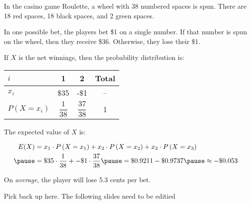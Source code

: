 \documentclass{beamer}
\newcommand{\prob}[1]{P\left({#1}\right)}
\begin{document}
\begin{frame}
\begin{example}
In the casino game Roulette, a wheel with 38 numbered spaces is spun. There are 18 red spaces, 18 black spaces, and 2 green spaces. \pause

\vspace{1mm}
In one possible bet, the players bet \$1 on a single number. If that number is spun on the wheel, then they receive \$36. Otherwise, they lose their \$1.\pause

\vspace{1mm}
If $X$ is the net winnings, then the probability distribution is:
\begin{center}
\begin{tabular}{lccc} \hline
$i$ & 1 & 2 & Total \\\hline
$x_i$ & \$35 & -\$1 & -- \\
$\prob{X=x_i}$ & $\dfrac{1}{38}$ & $\dfrac{37}{38}$ & 1\\[2mm]\hline
\end{tabular}
\end{center}\pause

The expected value of $X$ is:

\vspace{-2mm}
\begin{equation*}
\begin{aligned}
E(X) &= x_1\cdot\prob{X=x_1} + x_2\cdot\prob{X=x_2} + x_3\cdot\prob{X=x_3} \\\pause
&= \$35\cdot\dfrac{1}{38} + -\$1\cdot\dfrac{37}{38} \pause = \$0.9211 - \$0.9737 \pause \approx -\$0.053
\end{aligned}
\end{equation*}\pause

\vspace{-3mm}
On \emph{average}, the player will lose 5.3 cents per bet.
\end{example}
\end{frame}

\begin{frame}
\begin{note}
Pick back up here. The following slides need to be editied
\end{note}
\end{frame}
\end{document}
